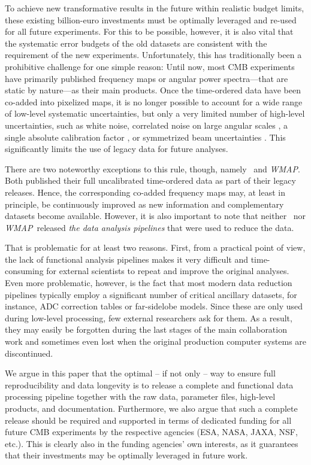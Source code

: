 \documentclass[twocolumn]{aa}
\def\WMAP{\textit{WMAP}}
\begin{document}
To achieve new transformative results in the future within realistic budget limits, these existing billion-euro investments must be optimally leveraged and re-used for all future experiments. For this to be possible, however, it is also vital that the systematic error budgets of the old datasets are consistent with the requirement of the new experiments. Unfortunately, this has traditionally been a prohibitive challenge for one simple reason: Until now, most CMB experiments have primarily published frequency maps or angular power spectra---that are static by nature---as their main products. Once the time-ordered data have been co-added into pixelized maps, it is no longer possible to account for a wide range of low-level systematic uncertainties, but only a very limited number of high-level uncertainties, such as white noise, correlated noise on large angular scales \citep{bennett2012,bp10}, a single absolute calibration factor \citep{planck2014-a10,bp07}, or symmetrized beam uncertainties \citep{planck2016-l05}. This significantly limits the use of legacy data for future analyses.

There are two noteworthy exceptions to this rule, though, namely \Planck\ and \WMAP. Both published their full uncalibrated time-ordered data as part of their legacy releases. Hence, the corresponding co-added frequency maps may, at least in principle, be continuously improved as new information and complementary datasets become available. However, it is also important to note that neither \Planck\ nor \WMAP\ released \emph{the data analysis pipelines} that were used to reduce the data.

That is problematic for at least two reasons. First, from a practical point of view, the lack of functional analysis pipelines makes it very difficult and time-consuming for external scientists to repeat and improve the original analyses. Even more problematic, however, is the fact that most modern data reduction pipelines typically employ a significant number of critical ancillary datasets, for instance, ADC correction tables or far-sidelobe models. Since these are only used during low-level processing, few external researchers ask for them. As a result, they may easily be forgotten during the last stages of the main collaboration work and sometimes even lost when the original production computer systems are discontinued.

We argue in this paper that the optimal -- if not only -- way to ensure full reproducibility and data longevity is to release a complete and functional data processing pipeline together with the raw data, parameter files, high-level products, and documentation. Furthermore, we also argue that such a complete release should be required and supported in terms of dedicated funding for all future CMB experiments by the respective agencies (ESA, NASA, JAXA, NSF, etc.). This is clearly also in the funding agencies' own interests, as it guarantees that their investments may be optimally leveraged in future work.
\end{document}

